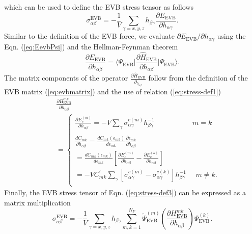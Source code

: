 which can be used to define the EVB stress tensor as follows
\begin{equation}\label{eq:stress-def3}
\sigma_{\alpha\beta}^{\text{EVB}}=-\frac{1}{V}\sum_{\gamma=x,y,z}h_{\beta\gamma}\frac{\partial E_{\text{EVB}}}{\partial h_{\alpha\gamma}}.
\end{equation}
Similar to the definition of the EVB force, we evaluate $\partial E_{\text{EVB}}/\partial h_{\alpha\gamma}$ using the Eqn. (\ref{eq:EevbPsi}) and the Hellman-Feynman theorem \cite{feynman1939} 
\begin{equation}\label{eq:stress-EVB}
\frac{\partial E_{\text{EVB}}}{\partial h_{\alpha\beta}}=\big\langle \Psi_{\text{EVB}}\big| \frac{\partial \hat{H}_{\text{EVB}}}{\partial h_{\alpha\beta}}\big| \Psi_{\text{EVB}}\big \rangle.
\end{equation}
The matrix components of the operator $\frac{\partial \hat{H}_{\text{EVB}}}{\partial_{h_{\alpha\beta}}}$ follow from the definition of the EVB matrix (\ref{eq:evbmatrix}) and the use of relation (\ref{eq:stress-def1})
\begin{eqnarray}\label{eq:stress-EVB-mat}
&&\frac{\partial H^{mk}_{\text{EVB}}}{\partial h_{\alpha\beta}} \\
&&=\begin{cases}
  \frac{\partial E_{c}^{(m)}}{\partial h_{\alpha\beta}}=-V\sum_{\gamma}\sigma_{\alpha\gamma}^{c(m)}h^{-1}_{\beta\gamma} \,\,\,\,\,\,\,\,\,\,\,\,\,\,\,\,\,\,\,\,\,\,\,\,\,\,\,\,\,\,\,\,  m=k  \\
\\
\frac{d C_{mk}}{\partial h_{\alpha\beta}}= \frac{d C_{mk}(\epsilon_{mk})}{d \epsilon_{mk}}\frac{\partial \epsilon_{mk}}{\partial h_{\alpha\beta}}\\
= \frac{d C_{mk}(\epsilon_{mk})}{d\epsilon_{mk}}\left[\frac{\partial E_{c}^{(m)}}{\partial h_{\alpha\beta}}-\frac{\partial E_{c}^{(k)}}{\partial h_{\alpha\beta}} \right]\
\\
=-VC^{\prime}_{mk}\sum_{\gamma}[\sigma_{\alpha\gamma}^{c(m)}-\sigma_{\alpha\gamma}^{c(k)}] h^{-1}_{\beta\gamma}  \,\,\,\,\,\,\,\,   m \ne k. \\
\end{cases} \nonumber 
\end{eqnarray}
Finally, the EVB stress tensor of Eqn. (\ref{eq:stress-def3}) can be expressed as a matrix multiplication
\begin{equation}\label{eq:stress-EVB-ab}
\sigma_{\alpha\beta}^{\text{EVB}}=-\frac{1}{V}\sum_{\gamma=x,y,z}h_{\beta\gamma}\sum_{m,k=1}^{N_F} \tilde{\Psi}^{(m)}_{\text{EVB}} \left(\frac{\partial H^{mk}_{\text{EVB}}}{\partial h_{\alpha\beta}}\right) \Psi^{(k)}_{\text{EVB}}.
\end{equation}
